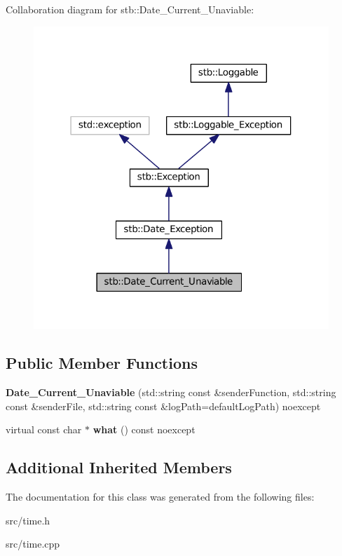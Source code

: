 Collaboration diagram for stb\+:\+:Date\+\_\+\+Current\+\_\+\+Unaviable\+:
\nopagebreak
\begin{figure}[H]
\begin{center}
\leavevmode
\includegraphics[width=316pt]{classstb_1_1Date__Current__Unaviable__coll__graph}
\end{center}
\end{figure}
\subsection*{Public Member Functions}
\begin{DoxyCompactItemize}
\item 
\hypertarget{classstb_1_1Date__Current__Unaviable_abf58d103ec51a9d9c0cb20eceb5b696a}{{\bfseries Date\+\_\+\+Current\+\_\+\+Unaviable} (std\+::string const \&sender\+Function, std\+::string const \&sender\+File, std\+::string const \&log\+Path=default\+Log\+Path) noexcept}\label{classstb_1_1Date__Current__Unaviable_abf58d103ec51a9d9c0cb20eceb5b696a}

\item 
\hypertarget{classstb_1_1Date__Current__Unaviable_a6d14c4a079024517aa1344b356623da6}{virtual const char $\ast$ {\bfseries what} () const noexcept}\label{classstb_1_1Date__Current__Unaviable_a6d14c4a079024517aa1344b356623da6}

\end{DoxyCompactItemize}
\subsection*{Additional Inherited Members}


The documentation for this class was generated from the following files\+:\begin{DoxyCompactItemize}
\item 
src/time.\+h\item 
src/time.\+cpp\end{DoxyCompactItemize}
